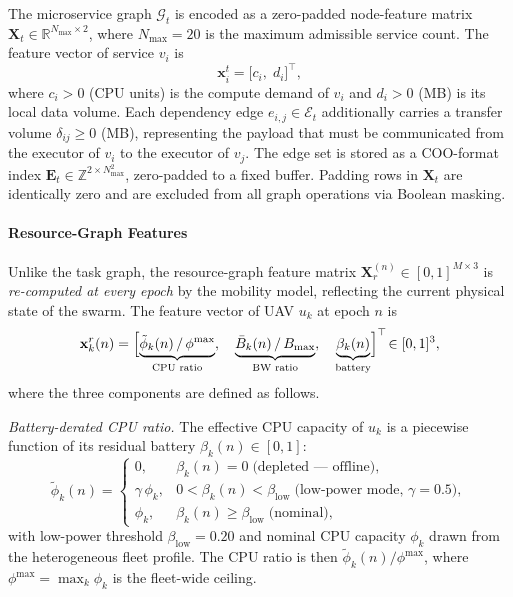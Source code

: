The microservice graph $\mathcal{G}_t$ is encoded as a zero-padded
node-feature matrix
$\mathbf{X}_t \in \mathbb{R}^{N_{\max} \times 2}$,
where $N_{\max} = 20$ is the maximum admissible service count.
The feature vector of service $v_i$ is
\begin{equation}
  \mathbf{x}_i^t = \bigl[c_i,\; d_i\bigr]^\top,
  \label{eq:task_feat}
\end{equation}
where $c_i > 0$ (CPU units) is the compute demand of $v_i$ and
$d_i > 0$ (MB) is its local data volume.
Each dependency edge $e_{i,j} \in \mathcal{E}_t$ additionally carries
a transfer volume $\delta_{ij} \geq 0$ (MB), representing the payload
that must be communicated from the executor of $v_i$ to the executor
of $v_j$.
The edge set is stored as a COO-format index
$\mathbf{E}_t \in \mathbb{Z}^{2 \times N_{\max}^2}$, zero-padded
to a fixed buffer.
Padding rows in $\mathbf{X}_t$ are identically zero and are excluded
from all graph operations via Boolean masking.

\paragraph{Resource-Graph Features}

Unlike the task graph, the resource-graph feature matrix
$\mathbf{X}_r^{(n)} \in [0,1]^{M \times 3}$ is \emph{re-computed at
every epoch} by the mobility model, reflecting the current physical
state of the swarm.
The feature vector of UAV $u_k$ at epoch $n$ is
\begin{equation}
  \mathbf{x}_k^r(n) =
  \Bigl[
    \underbrace{\tilde{\phi}_k(n)\,/\,\phi^{\max}}_{\text{CPU ratio}},\quad
    \underbrace{\bar{B}_k(n)\,/\,B_{\max}}_{\text{BW ratio}},\quad
    \underbrace{\beta_k(n)}_{\text{battery}}
  \Bigr]^\top \!\in [0,1]^3,
  \label{eq:res_feat}
\end{equation}
where the three components are defined as follows.

\textit{Battery-derated CPU ratio.}
The effective CPU capacity of $u_k$ is a piecewise function of its
residual battery $\beta_k(n) \in [0,1]$:
\begin{equation}
  \tilde{\phi}_k(n) =
  \begin{cases}
    0,          & \beta_k(n) = 0
                  \;\text{(depleted — offline)},\\
    \gamma\,\phi_k, & 0 < \beta_k(n) < \beta_{\mathrm{low}}
                  \;\text{(low-power mode, \(\gamma = 0.5\))},\\
    \phi_k,     & \beta_k(n) \geq \beta_{\mathrm{low}}
                  \;\text{(nominal)},
  \end{cases}
  \label{eq:cpu_derate}
\end{equation}
with low-power threshold $\beta_{\mathrm{low}} = 0.20$ and nominal
CPU capacity $\phi_k$ drawn from the heterogeneous fleet profile.
The CPU ratio is then $\tilde{\phi}_k(n)/\phi^{\max}$, where
$\phi^{\max} = \max_k \phi_k$ is the fleet-wide ceiling.

